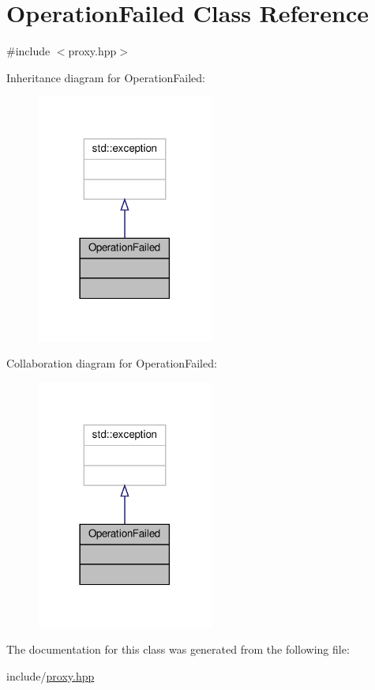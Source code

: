 \hypertarget{classOperationFailed}{}\section{Operation\+Failed Class Reference}
\label{classOperationFailed}


{\ttfamily \#include $<$proxy.\+hpp$>$}



Inheritance diagram for Operation\+Failed\+:
\nopagebreak
\begin{figure}[H]
\begin{center}
\leavevmode
\includegraphics[width=165pt]{classOperationFailed__inherit__graph}
\end{center}
\end{figure}


Collaboration diagram for Operation\+Failed\+:
\nopagebreak
\begin{figure}[H]
\begin{center}
\leavevmode
\includegraphics[width=165pt]{classOperationFailed__coll__graph}
\end{center}
\end{figure}


The documentation for this class was generated from the following file\+:\begin{DoxyCompactItemize}
\item 
include/\hyperlink{proxy_8hpp}{proxy.\+hpp}\end{DoxyCompactItemize}
